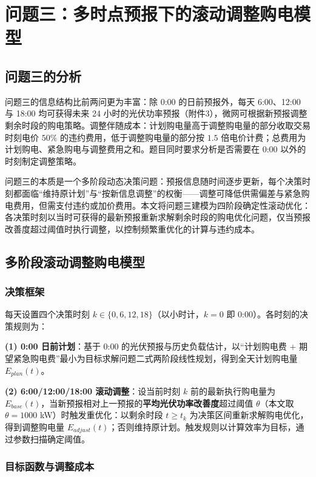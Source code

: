 \documentclass[zihao=-4,a4paper,UTF8,fontset=none]{ctexart}
\begin{document}
\section{问题三：多时点预报下的滚动调整购电模型}

\subsection{问题三的分析}

问题三的信息结构比前两问更为丰富：除 0:00 的日前预报外，每天 6:00、12:00 与 18:00 均可获得未来 24 小时的光伏功率预报（附件3），微网可根据新预报调整剩余时段的购电策略。调整伴随成本：计划购电量高于调整购电量的部分收取交易时刻电价 $50\%$ 的违约费用，低于调整购电量的部分按 $1.5$ 倍电价计费；总费用为计划购电、紧急购电与调整费用之和。题目同时要求分析是否需要在 0:00 以外的时刻制定调整策略。

问题三的本质是一个多阶段动态决策问题：预报信息随时间逐步更新，每个决策时刻都面临“维持原计划”与“按新信息调整”的权衡——调整可降低供需偏差与紧急购电费用，但需支付违约或加价费用。本文将问题三建模为四阶段确定性滚动优化：各决策时刻以当时可获得的最新预报重新求解剩余时段的购电优化问题，仅当预报改善度超过阈值时执行调整，以控制频繁重优化的计算与违约成本。

\subsection{多阶段滚动调整购电模型}

\subsubsection{决策框架}

每天设置四个决策时刻 $k\in\{0,6,12,18\}$（以小时计，$k=0$ 即 0:00）。各时刻的决策规则为：

\textbf{(1) 0:00 日前计划}：基于 0:00 的光伏预报与历史负载估计，以“计划购电费 $+$ 期望紧急购电费”最小为目标求解问题二式两阶段线性规划，得到全天计划购电量 $E_{plan}(t)$。

\textbf{(2) 6:00/12:00/18:00 滚动调整}：设当前时刻 $k$ 前的最新执行购电量为 $E_{base}(t)$，当新预报相对上一预报的\textbf{平均光伏功率改善度}超过阈值 $\theta$（本文取 $\theta=1000$ kW）时触发重优化：以剩余时段 $t\ge t_k$ 为决策区间重新求解购电优化，得到调整购电量 $E_{adjust}(t)$；否则维持原计划。触发规则以计算效率为目标，通过参数扫描确定阈值。

\subsubsection{目标函数与调整成本}
\end{document}
